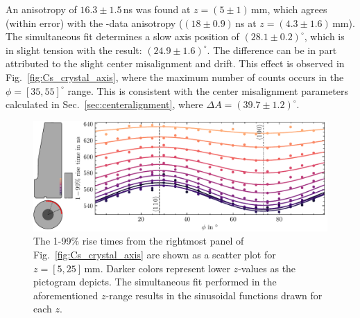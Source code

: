 An anisotropy of $16.3\pm1.5$\,ns was found at $z = (5\pm1)$\,mm, which agrees (within error) with the \BaS{}-data anisotropy ($(18\pm0.9)$\,ns at $z = (4.3\pm1.6)$\,mm). The simultaneous fit determines a slow axis position of $(28.1\pm0.2)^\circ$, which is in slight tension with the \BaS{} result: $(24.9\pm1.6)^\circ$. The difference can be in part attributed to the slight center misalignment and drift. This effect is observed in Fig.~\ref{fig:Cs_crystal_axis}, where the maximum number of counts occurs in the $\phi = [35, 55]^\circ$ range. This is consistent with the center misalignment parameters calculated in Sec.~\ref{sec:centeralignment}, where $\Delta A = (39.7\pm1.2)^\circ$.
\begin{figure}[H]
    \centering
    \includegraphics[width=6in]{figs/library/Cs_crystal_axis_fits.pdf}
    \caption{The 1-99\% rise times from the rightmost panel of Fig.~\ref{fig:Cs_crystal_axis} are shown as a scatter plot for $z = [5, 25]$\,mm. Darker colors represent lower $z$-values as the pictogram depicts. The simultaneous fit performed in the aforementioned $z$-range results in the sinusoidal functions drawn for each $z$.}
	\label{fig:Cs_crystal_axis_fits}
\end{figure}

\clearpage


